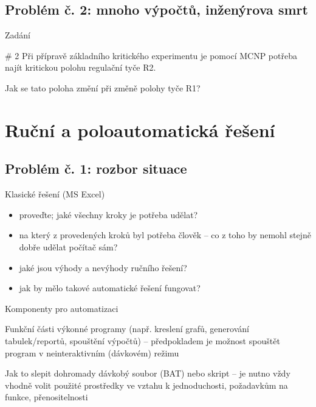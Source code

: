 \documentclass{beamer}
\begin{document}
\subsection{Problém č. 2: mnoho výpočtů, inženýrova smrt}

\begin{frame}{Zadání}
  \begin{block}{\# 2}
    Při přípravě základního kritického experimentu je pomocí MCNP potřeba najít kritickou polohu regulační tyče R2. 
    
    Jak se tato poloha změní při změně polohy tyče R1?
  \end{block}
\end{frame}

\section{Ruční a poloautomatická řešení}

\subsection{Problém č. 1: rozbor situace}

\begin{frame}{Klasické řešení (MS Excel)}
  \begin{itemize}
    \item proveďte; jaké všechny kroky je potřeba udělat?
    \item na který z provedených kroků byl potřeba člověk -- co z toho by nemohl stejně dobře udělat počítač sám?
    \item jaké jsou výhody a nevýhody ručního řešení?
    \item jak by mělo takové automatické řešení fungovat?
  \end{itemize}
\end{frame}

\begin{frame}{Komponenty pro automatizaci}
  \begin{block}{Funkční části}
    výkonné programy (např. kreslení grafů, generování tabulek/reportů, spouštění výpočtů) -- předpokladem je možnost spouštět program v neinteraktivním (dávkovém) režimu
  \end{block}
  \begin{block}{Jak to slepit dohromady}
    dávkobý soubor (BAT) nebo skript -- je nutno vždy vhodně volit použité prostředky ve vztahu k jednoduchosti, požadavkům na funkce, přenositelnosti
  \end{block}
\end{frame}
\end{document}

